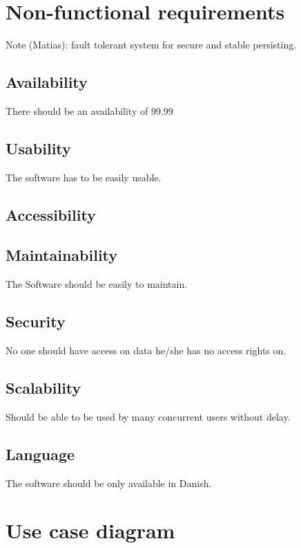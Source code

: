 \documentclass{article}
\begin{document}
\section{Non-functional requirements}

Note (Matias): fault tolerant system for secure and stable persisting.

\subsection{Availability}
There should be an availability of 99.99%

\subsection{Usability}
The software has to be easily usable.

\subsection{Accessibility}

\subsection{Maintainability}
The Software should be easily to maintain.

\subsection{Security}
No one should have access on data he/she has no access rights on.

\subsection{Scalability}
Should be able to be used by many concurrent users without delay.

\subsection{Language}
The software should be only available in Danish.

\section{Use case diagram}

\end{document}
